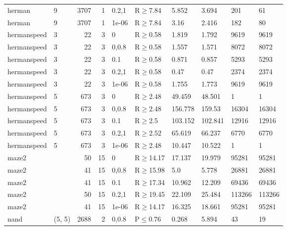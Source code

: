 \begin{longtable}{llrrllllll}
 herman        & 9         &   	3707 &   1 & 0.2,1 & R$\geq$7.84  & 5.852   & 3.694    & 201    & 61     \\
 herman        & 9         &   	3707 &   1 & 1e-06 & R$\geq$7.84  & 3.16    & 2.416    & 182    & 80     \\
 hermanspeed   & 3         &     	22 &   3 & 0     & R$\geq$0.58  & 1.819   & 1.792    & 9619   & 9619   \\
 hermanspeed   & 3         &     	22 &   3 & 0,0.8 & R$\geq$0.58  & 1.557   & 1.571    & 8072   & 8072   \\
 hermanspeed   & 3         &     	22 &   3 & 0.1   & R$\geq$0.58  & 0.871   & 0.857    & 5293   & 5293   \\
 hermanspeed   & 3         &     	22 &   3 & 0.2,1 & R$\geq$0.58  & 0.47    & 0.47     & 2374   & 2374   \\
 hermanspeed   & 3         &     	22 &   3 & 1e-06 & R$\geq$0.58  & 1.755   & 1.773    & 9619   & 9619   \\
 hermanspeed   & 5         &    	673 &   3 & 0     & R$\geq$2.48  & 49.459  & 48.501   & 1      & 1      \\
 hermanspeed   & 5         &    	673 &   3 & 0,0.8 & R$\geq$2.48  & 156.778 & 159.53   & 16304  & 16304  \\
 hermanspeed   & 5         &    	673 &   3 & 0.1   & R$\geq$2.5   & 103.152 & 102.841  & 12916  & 12916  \\
 hermanspeed   & 5         &    	673 &   3 & 0.2,1 & R$\geq$2.52  & 65.619  & 66.237   & 6770   & 6770   \\
 hermanspeed   & 5         &    	673 &   3 & 1e-06 & R$\geq$2.48  & 10.447  & 10.522   & 1      & 1      \\
 maze2         &           &     	50 &  15 & 0     & R$\geq$14.17 & 17.137  & 19.979   & 95281  & 95281  \\
 maze2         &           &     	41 &  15 & 0,0.8 & R$\geq$15.98 & 5.0     & 5.778    & 26881  & 26881  \\
 maze2         &           &     	41 &  15 & 0.1   & R$\geq$17.34 & 10.962  & 12.209   & 69436  & 69436  \\
 maze2         &           &     	50 &  15 & 0.2,1 & R$\geq$19.45 & 22.109  & 25.484   & 113266 & 113266 \\
 maze2         &           &     	41 &  15 & 1e-06 & R$\geq$14.17 & 16.325  & 18.661   & 95281  & 95281  \\
 nand          & (5, 5)    &   	2688 &   2 & 0,0.8 & P$\leq$0.76  & 0.268   & 5.894    & 43     & 19     \\

\end{longtable}
